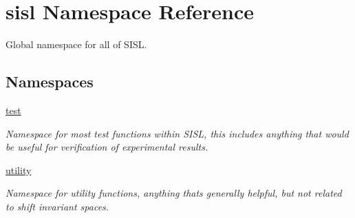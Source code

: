 \hypertarget{namespacesisl}{}\section{sisl Namespace Reference}
\label{namespacesisl}


Global namespace for all of S\+I\+SL.  


\subsection*{Namespaces}
\begin{DoxyCompactItemize}
\item 
 \hyperlink{namespacesisl_1_1test}{test}
\begin{DoxyCompactList}\small\item\em Namespace for most test functions within S\+I\+SL, this includes anything that would be useful for verification of experimental results. \end{DoxyCompactList}\item 
 \hyperlink{namespacesisl_1_1utility}{utility}
\begin{DoxyCompactList}\small\item\em Namespace for utility functions, anything that\textquotesingle{}s generally helpful, but not related to shift invariant spaces. \end{DoxyCompactList}\end{DoxyCompactItemize}
